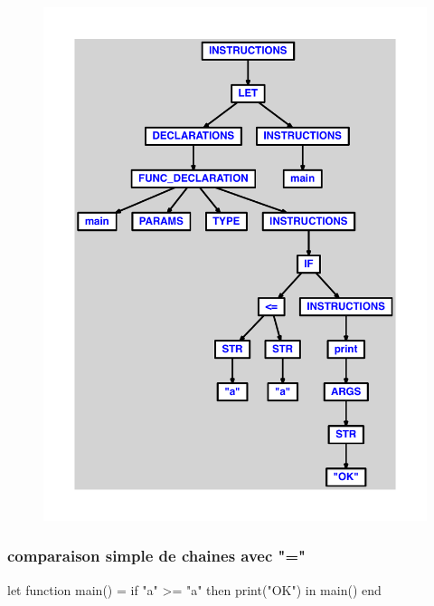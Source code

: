 \documentclass{article}
\begin{document}
\begin{figure}[H]\centering\includegraphics[max width=\textwidth]{ast/ast_177.pdf}\end{figure}\subsubsection{comparaison simple de chaines avec "="}
\begin{verbatimtab}
let
	function main() =
		if "a" >= "a" then print("OK")
in main() end
\end{verbatimtab}
\end{document}
